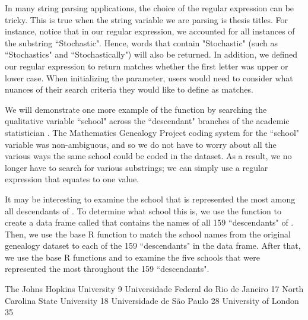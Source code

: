 \documentclass[article,shortnames]{jss}
\begin{document}
In many string parsing applications, the choice of the regular expression can be tricky. This is true when the string variable we are parsing is thesis titles. For instance, notice that in our regular expression, we accounted for all instances of the substring ``Stochastic". Hence, words that contain "Stochastic" (such as ``Stochastics" and ``Stochastically") will also be returned. In addition, we defined our regular expression to return matches whether the first letter was upper or lower case. When initializing the  parameter, users would need to consider what nuances of their search criteria they would like to define as matches.

We will demonstrate one more example of the  function by searching the qualitative variable ``school" across the ``descendant" branches of the academic statistician . The Mathematics Genealogy Project coding system for the ``school" variable was non-ambiguous, and so we do not have to worry about all the various ways the same school could be coded in the dataset. As a result, we no longer have to search for various substrings; we can simply use a regular expression that equates to one value.

It may be interesting to examine the school that is represented the most among all descendants of . To determine what school this is, we use the  function to create a data frame called  that contains the names of all 159 ``descendants" of . Then, we use the base R function  to match the school names from the original genealogy dataset to each of the 159 ``descendants" in the  data frame. After that, we use the base R functions  and  to examine the five schools that were represented the most throughout the 159 ``descendants".

\begin{CodeChunk}
\begin{CodeOutput}
          The Johns Hopkins University
                                     9
Universidade Federal do Rio de Janeiro
                                    17
       North Carolina State University
                                    18
             Universidade de São Paulo
                                    28
                  University of London
                                    35
\end{CodeOutput}
\end{CodeChunk}
\end{document}
